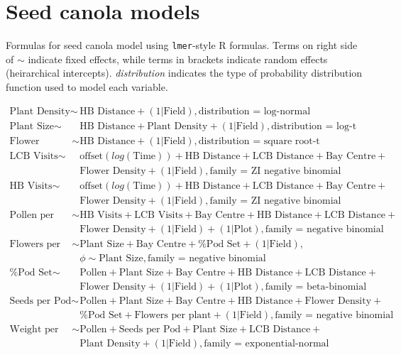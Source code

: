 \section*{Seed canola models}

Formulas for seed canola model using \texttt{lmer}-style R formulas. Terms on right side of $\sim$ indicate fixed effects, while terms in brackets indicate random effects (heirarchical intercepts). \textit{distribution} indicates the type of probability distribution function used to model each variable.

\begin{align*}
    \text{Plant Density} \sim & \text{HB Distance} + (1|\text{Field}), \text{distribution = log-normal} \\
    \text{Plant Size} \sim & \text{HB Distance} + \text{Plant Density} + (1|\text{Field}) ,\text{distribution = log-t} \\
    \text{Flower Density} \sim & \text{HB Distance} + (1|\text{Field}), \text{distribution = square root-t} \\
    \text{LCB Visits} \sim & \text{offset}(log(\text{Time})) + \text{HB Distance} + \text{LCB Distance} + \text{Bay Centre} + \\
    &   \text{Flower Density} + (1|\text{Field}), \text{family = ZI negative binomial} \\
    \text{HB Visits} \sim & \text{offset}(log(\text{Time})) + \text{HB Distance} + \text{LCB Distance} + \text{Bay Centre} + \\
    &   \text{Flower Density} + (1|\text{Field}), \text{family = ZI negative binomial} \\
    \text{Pollen per Stigma} \sim & \text{HB Visits} + \text{LCB Visits} + \text{Bay Centre} + \text{HB Distance} + \text{LCB Distance} +\\
    &   \text{Flower Density} + (1|\text{Field}) + (1|\text{Plot}), \text{family = negative binomial} \\
    \text{Flowers per Plant} \sim & \text{Plant Size} + \text{Bay Centre} + \text{\% Pod Set} + (1|\text{Field}),\\
    &   \phi \sim \text{Plant Size}, \text{family = negative binomial} \\
    \text{\% Pod Set} \sim & \text{Pollen} + \text{Plant Size} + \text{Bay Centre} + \text{HB Distance} + \text{LCB Distance} + \\
    &   \text{Flower Density} + (1|\text{Field}) + (1|\text{Plot}), \text{family = beta-binomial} \\
    \text{Seeds per Pod} \sim & \text{Pollen} + \text{Plant Size} + \text{Bay Centre} + \text{HB Distance} + \text{Flower Density} +\\
    &   \text{\% Pod Set} + \text{Flowers per plant} + (1|\text{Field}), \text{family = negative binomial} \\
    \text{Weight per Seed} \sim & \text{Pollen} + \text{Seeds per Pod} + \text{Plant Size} + \text{LCB Distance} +\\
    &   \text{Plant Density} + (1|\text{Field}), \text{family = exponential-normal}\\
\end{align*}

